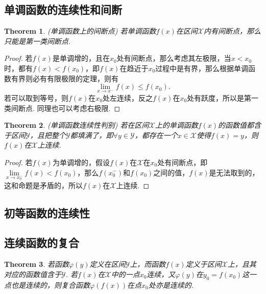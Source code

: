 \documentclass{article}
\newtheorem{theorem}{Theorem}[section]
\begin{document}
\subsection{单调函数的连续性和间断}

\begin{theorem}
\rm {\color{red} (单调函数上的间断点)} 若单调函数$f(x)$在区间$\mathcal{X}$内有间断点，那么只能是第一类间断点.
\end{theorem}

\begin{proof}
若$f(x)$是单调增的，且在$x_0$处有间断点，那么考虑其左极限，当$x < x_0$时，都有$f(x) < f(x_0)$，即$f(x)$在趋近于$x_0$过程中是有界，那么根据单调函数有界则必有有限极限的定理，则有
$$
\lim\limits_{x \rightarrow x^-} f(x) \leq f(x_0).
$$
若可以取到等号，则$f(x)$在$x_0$处左连续，反之$f(x)$在$x_0$处有跃度，所以是第一类间断点. 同理也可以考虑右极限.
\end{proof}

\begin{theorem}
\rm {\color{red} (单调函数连续性判别)} 若在区间$\mathcal{X}$上的单调函数$f(x)$的函数值都含于区间$\mathcal{Y}$，且把整个$\mathcal{Y}$都填满了，即$\forall y \in \mathcal{Y}$，都存在一个$x \in \mathcal{X}$使得$f(x) = y$，则$f(x)$在$\mathcal{X}$上连续.
\end{theorem}

\begin{proof}
若$f(x)$为单调增的，假设$f(x)$在$\mathcal{X}$在$x_0$处有间断点，即$\lim\limits_{x \rightarrow x_0 ^-} f(x) < f(x_0)$，那么$f(x_0^-)$和$f(x_0)$之间的值，$f(x)$是无法取到的，这和命题是矛盾的，所以$f(x)$在$\mathcal{X}$上连续.
\end{proof}

\subsection{初等函数的连续性}

\subsection{连续函数的复合}

\begin{theorem}
\rm 若函数$\varphi(y)$定义在区间$\mathcal{Y}$上，而函数$f(x)$定义于区间$\mathcal{X}$上，且其对应的函数值含于$\mathcal{Y}$. 若$f(x)$在$\mathcal{X}$中的一点$x_0$连续，又$\varphi(y)$在$y_0 = f(x_0)$这一点也是连续的，则复合函数$\varphi(f(x))$在点$x_0$处亦是连续的.
\end{theorem}
\end{document}
